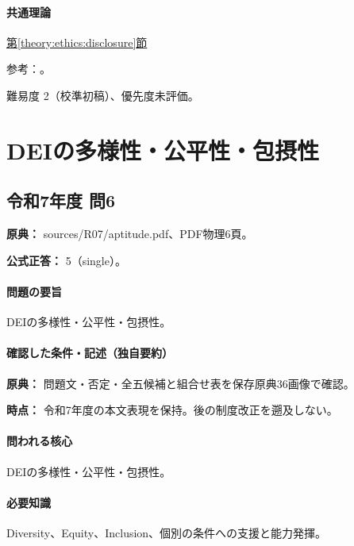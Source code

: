 \paragraph{共通理論} \hyperref[theory:ethics:disclosure]{第\ref*{theory:ethics:disclosure}節}

\par 参考：\cite{ipej_ethics2011,scu_ethics_framework}。

\par 難易度 2（校準初稿）、優先度未評価。

\section{DEIの多様性・公平性・包摂性}

\subsection{令和7年度 問6}
\label{q:r07-reg-apt-06}

\noindent\textbf{原典：} sources/R07/aptitude.pdf、PDF物理6頁。

\textbf{公式正答：} 5（single）。

\paragraph{問題の要旨} DEIの多様性・公平性・包摂性。

\paragraph{確認した条件・記述（独自要約）}\mbox{}\par

\noindent\textbf{原典：} 問題文・否定・全五候補と組合せ表を保存原典36画像で確認。\par

\noindent\textbf{時点：} 令和7年度の本文表現を保持。後の制度改正を遡及しない。\par

\paragraph{問われる核心} DEIの多様性・公平性・包摂性。

\paragraph{必要知識} Diversity、Equity、Inclusion、個別の条件への支援と能力発揮。

